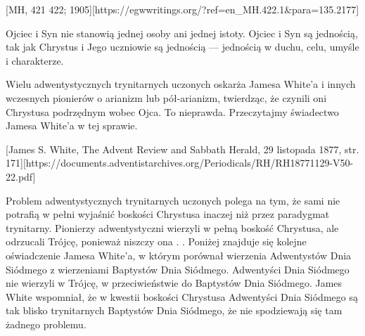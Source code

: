 [MH, 421 422; 1905][https://egwwritings.org/?ref=en\_MH.422.1&para=135.2177]

Ojciec i Syn nie stanowią jednej osoby ani jednej istoty. Ojciec i Syn są jednością, tak jak Chrystus i Jego uczniowie są jednością — jednością w duchu, celu, umyśle i charakterze.

Wielu adwentystycznych trynitarnych uczonych oskarża Jamesa White'a i innych wczesnych pionierów o arianizm lub pół-arianizm, twierdząc, że czynili oni Chrystusa podrzędnym wobec Ojca. To nieprawda. Przeczytajmy świadectwo Jamesa White'a w tej sprawie.


[James S. White, The Advent Review and Sabbath Herald, 29 listopada 1877, str. 171][https://documents.adventistarchives.org/Periodicals/RH/RH18771129-V50-22.pdf]

Problem adwentystycznych trynitarnych uczonych polega na tym, że sami nie potrafią w pełni wyjaśnić boskości Chrystusa inaczej niż przez paradygmat trynitarny. Pionierzy adwentystyczni wierzyli w pełną boskość Chrystusa, ale odrzucali Trójcę, ponieważ niszczy ona . . Poniżej znajduje się kolejne oświadczenie Jamesa White'a, w którym porównał wierzenia Adwentystów Dnia Siódmego z wierzeniami Baptystów Dnia Siódmego. Adwentyści Dnia Siódmego nie wierzyli w Trójcę, w przeciwieństwie do Baptystów Dnia Siódmego. James White wspomniał, że w kwestii boskości Chrystusa Adwentyści Dnia Siódmego są tak blisko trynitarnych Baptystów Dnia Siódmego, że nie spodziewają się tam żadnego problemu.

